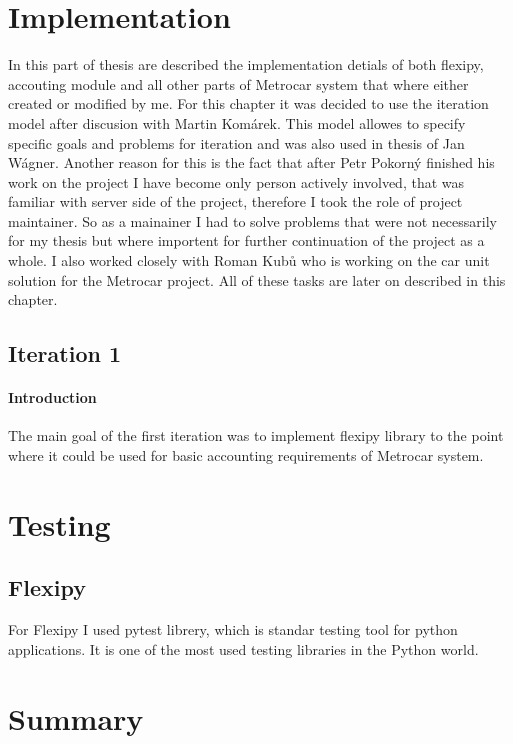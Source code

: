 \documentclass[11pt,twoside,a4paper]{book}
\begin{document}
\chapter{Implementation}
In this part of thesis are described the implementation detials of both flexipy, accouting module and all other parts of Metrocar system that where either created or modified by me. For this chapter it was decided to use the iteration model after discusion with Martin Komárek. This model allowes to specify specific goals and problems for iteration and was also used in thesis of Jan Wágner. Another reason for this is the fact that after Petr Pokorný finished his work on the project I have become only person actively involved, that was familiar with server side of the project, therefore I took the role of project maintainer. So as a mainainer I had to solve problems that were not necessarily for my thesis but where importent for further continuation of the project as a whole. I also worked closely with Roman Kubů who is working on the car unit solution for the Metrocar project. All of these tasks are later on described in this chapter.

\section{Iteration 1}
\subsubsection{Introduction}
The main goal of the first iteration was to implement flexipy library to the point where it could be used for basic accounting requirements of Metrocar system.  





\chapter{Testing}
\section{Flexipy}
For Flexipy I used pytest librery, which is standar testing tool for python applications. It is one of the most used testing libraries in the Python world. 

\chapter{Summary}
\end{document}

